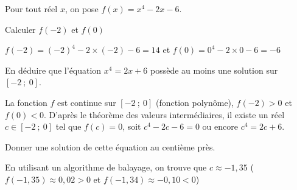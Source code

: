 \documentclass[11pt,a4paper]{article}  %
\begin{document}
Pour tout réel $x$, on pose $f(x)=x^4-2 x-6$.
\begin{enumMet}
	\item {} Calculer $f(-2)$ et $f(0)$
	\begin{corrBox}
		$f(-2)=(-2)^4-2\times (-2)-6=14$ et $f(0)=0^4-2\times 0-6=-6$
	\end{corrBox}
	\item {} En déduire que l'équation $x^4=2 x+6$ possède au moins une solution sur $[-2\ ;\ 0]$.
	\begin{corrBox}
		La fonction $f$ est continue sur $[-2\ ;\ 0]$ (fonction polynôme), $f(-2)>0$ et $f(0)<0$. D'après le théorème des valeurs intermédiaires, il existe un réel $c \in[-2\ ;\ 0]$ tel que $f(c)=0$, soit $c^4-2 c-6=0$ ou encore $c^4=2c+6$.
	\end{corrBox}
	\item {} Donner une solution de cette équation au centième près.
	\begin{corrBox}
		En utilisant un algorithme de balayage, on trouve que $c \approx -1,35$ \quad ($f(-1,35)\approx 0,02>0$ et $f(-1,34)\approx -0,10<0$)
	\end{corrBox}
\end{enumMet}

\end{document}

